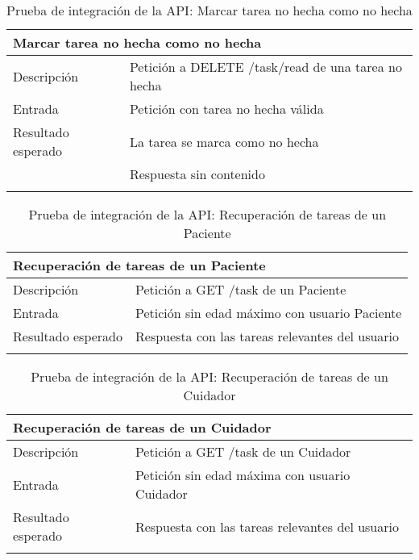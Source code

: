 \begin{longtable}{|p{} p{}|}
    \hline
    \multicolumn{2}{|l|}{\textbf{Marcar tarea no hecha como no hecha}} \\ \hline 
    Descripción                 & Petición a DELETE /task/read de una tarea no hecha\\ \hline
    Entrada                     & Petición con tarea no hecha válida \\
    Resultado esperado          & La tarea se marca como no hecha \\
                                & Respuesta sin contenido \\ \hline
    \caption{Prueba de integración de la API: Marcar tarea no hecha como no hecha}
    \label{cp:i:api:marcar_tarea_no_hecha_no_hecha}
\end{longtable}

\begin{longtable}{|p{} p{}|}
    \hline
    \multicolumn{2}{|l|}{\textbf{Recuperación de tareas de un Paciente}} \\ \hline 
    Descripción                 & Petición a GET /task de un Paciente \\ \hline
    Entrada                     & Petición sin edad máximo con usuario Paciente \\ \hline
    Resultado esperado          & Respuesta con las tareas relevantes del usuario \\ \hline
    \caption{Prueba de integración de la API: Recuperación de tareas de un Paciente}
    \label{cp:i:api:recuperacion_tareas_paciente}
\end{longtable}

\begin{longtable}{|p{} p{}|}
    \hline
    \multicolumn{2}{|l|}{\textbf{Recuperación de tareas de un Cuidador}} \\ \hline 
    Descripción                 & Petición a GET /task de un Cuidador \\ \hline
    Entrada                     & Petición sin edad máxima con usuario Cuidador \\ \hline
    Resultado esperado          & Respuesta con las tareas relevantes del usuario \\ \hline
    \caption{Prueba de integración de la API: Recuperación de tareas de un Cuidador}
    \label{cp:i:api:recuperacion_tareas_cuidador}
\end{longtable}

